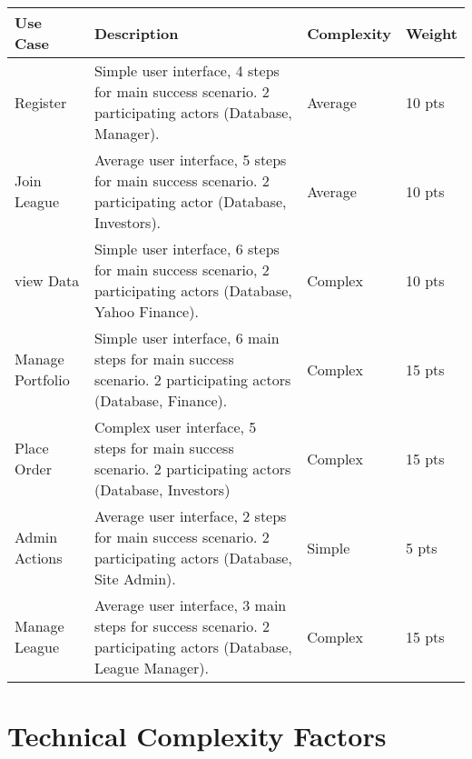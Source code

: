 \renewcommand\arraystretch{2}
\begin{longtable}{|p{1in}|p{3.9in}|p{0.8in}|p{.5in}|}
\hline
{\large \color{color1}Use Case}&{\large \color{color1}Description}&{\large \color{color1}Complexity}&{\large \color{color1}Weight} \\ \hline
Register&Simple user interface, 4 steps for main success scenario. 2 participating actors (Database, Manager).&Average &10 pts \\ \hline
Join League&Average user interface, 5 steps for main success scenario. 2 participating actor (Database, Investors).&Average &10 pts \\ \hline
view Data&Simple user interface, 6 steps for main success scenario, 2 participating actors (Database, Yahoo Finance).&Complex &10 pts \\ \hline
Manage Portfolio&Simple user interface, 6 main steps for main success scenario. 2 participating actors (Database, Finance).&Complex &15 pts \\ \hline
Place Order&Complex user interface, 5 steps for main success scenario. 2 participating actors (Database, Investors)&Complex &15 pts \\ \hline 
Admin Actions&Average user interface, 2 steps for main success scenario. 2 participating actors (Database, Site Admin). &Simple &5 pts \\ \hline 
Manage League& Average user interface, 3 main steps for success scenario. 2 participating actors (Database, League Manager). &Complex&15 pts\\ \hline
\end{longtable}

\section{Technical Complexity Factors}

